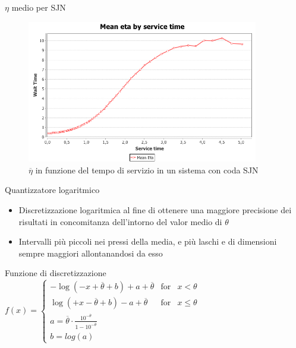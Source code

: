 \documentclass[slidestop,compress,mathserif]{beamer}
\begin{document}
\begin{frame}{$\eta$ medio per SJN}
\begin{figure}[!h]{
	\begin{center}
	   \includegraphics[width=0.9\textwidth]{figures/MG1SJN[rho_08,mu_05,runs_1000,arrivals_100000,steps_30,mult_10].png}
	\end{center}}
	\caption{\footnotesize $\overline{\eta}$ in funzione del tempo di servizio in un sistema con coda SJN}
	\label{fig:random}
\end{figure}
\normalsize
\end{frame}

\begin{frame}{Quantizzatore logaritmico}
\vfill
\begin{itemize}
\item Discretizzazione logaritmica al fine di ottenere una maggiore precisione dei risultati in concomitanza dell'intorno del valor medio di $\theta$
\item Intervalli pi\`u piccoli nei pressi della media, e pi\`u laschi e di dimensioni sempre maggiori allontanandosi da esso
\end{itemize}
\begin{block}{Funzione di discretizzazione}
$f(x) =	\left\{ \begin{array}{rcl}  
	-\log(-x+\overline{\theta}+b) + a + \overline{\theta} & \mbox{for} & x<\theta \\ 
	\log(+x-\overline{\theta}+b) - a + \overline{\theta} & \mbox{for} & x\leq\theta \\ 
	a = \overline{\theta}\cdot \frac{10^{-\overline{\theta}}}{1 - 10^{-\overline{\theta}}} & & \\ 
	b = log(a) \end{array} 
 \right.$ 
\end{block}
\vfill
\end{frame}
\end{document}
